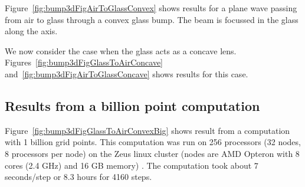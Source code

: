 Figure~\ref{fig:bump3dFigAirToGlassConvex} shows results for a plane wave passing from air to glass through a
convex glass bump. The beam is focussed in the glass along the axis.


We now consider the case when the glass acts as a concave lens.
Figures~\ref{fig:bump3dFigGlassToAirConcave} and~\ref{fig:bump3dFigAirToGlassConcave} shows
results for this case.




\clearpage
\subsection{Results from a billion point computation}

Figure~\ref{fig:bump3dFigGlassToAirConvexBig} shows result from a computation
with 1 billion grid points. This computation was run on 
256 processors (32 nodes, 8 processors per node) on the Zeus linux cluster
(nodes are AMD Opteron with 8 cores (2.4 GHz) and 16 GB memory) . The computation took about
$7$ seconds/step or 8.3 hours for 4160 steps.


